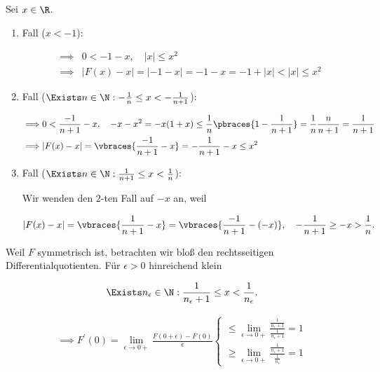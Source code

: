 \begin{solution}

Sei $x \in \R$.

\begin{enumerate}[label = \arabic*.]

    \item Fall ($x < -1$):
    
    \begin{align*}
        \implies &
        0 < -1 - x, \quad |x| \leq x^2 \\
        \implies &
        |F(x) - x|
        =
        |-1 - x|
        =
        -1 - x
        =
        -1 + |x|
        <
        |x|
        \leq
        x^2
    \end{align*}

    \item Fall ($\Exists n \in \N: -\frac{1}{n} \leq x < -\frac{1}{n+1}$):
    
    \begin{align*}
        \implies &
        0 < \frac{-1}{n+1} - x, \quad -x - x^2 = -x (1 + x) \leq \frac{1}{n} \pbraces{1 - \frac{1}{n+1}} = \frac{1}{n} \frac{n}{n+1} = \frac{1}{n+1} \\
        \implies &
        |F(x) - x|
        =
        \vbraces{\frac{-1}{n+1} - x}
        =
        -\frac{1}{n+1} - x
        \leq
        x^2
    \end{align*}

    \item Fall ($\Exists n \in \N: \frac{1}{n+1} \leq x < \frac{1}{n}$):
    
    Wir wenden den $2$-ten Fall auf $-x$ an, weil

    \begin{align*}
        |F(x) - x| = \vbraces{\frac{1}{n+1} - x} = \vbraces{\frac{-1}{n+1} - (-x)},
        \quad
        -\frac{1}{n+1} \geq -x > \frac{1}{n}.
    \end{align*}

\end{enumerate}

Weil $F$ symmetrisch ist, betrachten wir bloß den rechtsseitigen Differentialquotienten.
Für $\epsilon > 0$ hinreichend klein

\begin{align*}
    \Exists n_\epsilon \in \N:
        \frac{1}{n_\epsilon + 1} \leq x < \frac{1}{n_\epsilon}.
\end{align*}

\begin{align*}
    \implies
    F^\prime(0)
    =
    \lim_{\epsilon \to 0+}
        \frac{F(0 + \epsilon) - F(0)}{\epsilon}
    \begin{cases}
        \leq \lim_{\epsilon \to 0+} \frac{\frac{1}{n_\epsilon + 1}}{\frac{1}{n_\epsilon + 1}} = 1 \\
        \geq \lim_{\epsilon \to 0+} \frac{\frac{1}{n_\epsilon + 1}}{\frac{1}{n_\epsilon    }} = 1
    \end{cases}
\end{align*}

\end{solution}

